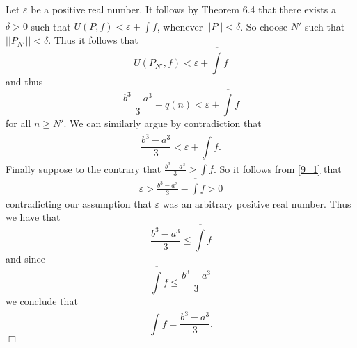 \documentclass[9pt]{article}
\newcommand{\qed}{\hfill \ensuremath{\Box}}
\newcommand{\D}{\displaystyle}
\begin{document}
\begin{enumerate}
      Let $\varepsilon$ be a positive real number. It follows by Theorem 6.4
      that there exists a $\delta > 0$ such that
      $U(P, f) < \varepsilon + \overline{\int} f$, whenever $||P|| < \delta$. So
      choose $N'$ such that $||P_{N'}|| < \delta$. Thus it follows that
      $$U(P_{N'}, f) < \varepsilon + \overline{\int} f$$
      and thus
      $$\frac{b^3-a^3}{3} + q(n) < \varepsilon + \overline{\int} f$$      
      for all $n \ge N'$. We can similarly argue by contradiction that
      \begin{equation}\label{9_1}
         \frac{b^3-a^3}{3} < \varepsilon + \overline{\int} f.
      \end{equation}
      Finally suppose to the contrary that
      $\D\frac{b^3-a^3}{3} > \overline{\int} f$. So it follows from \eqref{9_1}
      that
      \begin{align*}
         \varepsilon > \frac{b^3-a^3}{3} - \overline{\int} f > 0
      \end{align*}
      contradicting our assumption that $\varepsilon$ was an arbitrary positive
      real number. Thus we have that
      $$\frac{b^3-a^3}{3} \le \overline{\int} f$$
      and since
      $$\overline{\int} f \le \frac{b^3-a^3}{3}$$
      we conclude that
      $$\overline{\int} f = \frac{b^3-a^3}{3}.$$ \qed      
\end{enumerate}
\end{document}

